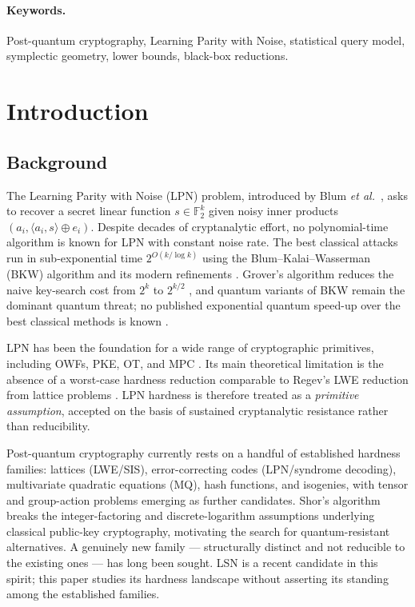 \documentclass[11pt,a4paper]{article}
\theoremstyle{plain}
\theoremstyle{definition}
\newcommand{\F}{\mathbb{F}}
\newcommand{\etal}{\textit{et al.}}
\begin{document}
\paragraph{\textbf{Keywords.}} Post-quantum cryptography, Learning Parity with Noise, statistical query model, symplectic geometry, lower bounds, black-box reductions.

\section{Introduction}
\label{sec:intro}

\subsection{Background}
\label{subsec:background}

The Learning Parity with Noise (LPN) problem, introduced by Blum \etal\ \cite{BFKL94}, asks to recover a secret linear function $s \in \F_2^k$ given noisy inner products $(a_i, \langle a_i, s \rangle \oplus e_i)$. Despite decades of cryptanalytic effort, no polynomial-time algorithm is known for LPN with constant noise rate. The best classical attacks run in sub-exponential time $2^{O(k / \log k)}$ using the Blum--Kalai--Wasserman (BKW) algorithm \cite{BKW03} and its modern refinements \cite{LF06,Lyu05,EKM17,GJL14}. Grover's algorithm reduces the naive key-search cost from $2^k$ to $2^{k/2}$ \cite{Gro96}, and quantum variants of BKW remain the dominant quantum threat; no published exponential quantum speed-up over the best classical methods is known \cite{Kir11}.

LPN has been the foundation for a wide range of cryptographic primitives, including OWFs, PKE, OT, and MPC \cite{ABW10,Ale11,DGM14,BCGI18}. Its main theoretical limitation is the absence of a worst-case hardness reduction comparable to Regev's LWE reduction from lattice problems \cite{Reg05}. LPN hardness is therefore treated as a \emph{primitive assumption}, accepted on the basis of sustained cryptanalytic resistance rather than reducibility.

Post-quantum cryptography currently rests on a handful of established hardness families: lattices (LWE/SIS), error-correcting codes (LPN/syndrome decoding), multivariate quadratic equations (MQ), hash functions, and isogenies, with tensor and group-action problems emerging as further candidates. Shor's algorithm \cite{Sho94} breaks the integer-factoring and discrete-logarithm assumptions underlying classical public-key cryptography, motivating the search for quantum-resistant alternatives. A genuinely new family --- structurally distinct and not reducible to the existing ones --- has long been sought. LSN is a recent candidate in this spirit; this paper studies its hardness landscape without asserting its standing among the established families.
\end{document}
